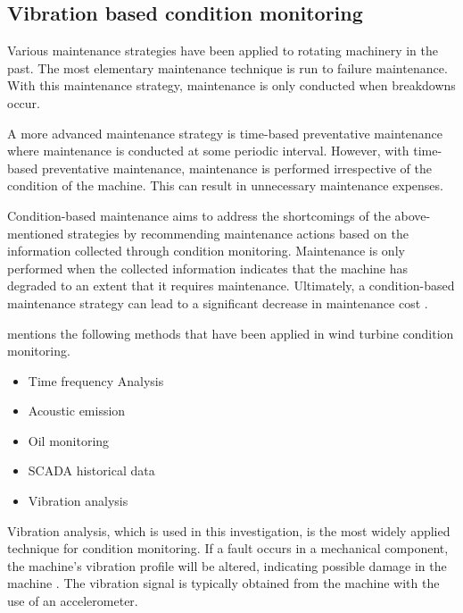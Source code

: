 \subsection{Vibration based condition monitoring}


Various maintenance strategies have been applied to rotating machinery in the past. The most elementary maintenance technique is run to failure maintenance. With this maintenance strategy, maintenance is only conducted when breakdowns occur.

A more advanced maintenance strategy is time-based preventative maintenance where maintenance is conducted at some periodic interval. However, with time-based preventative maintenance, maintenance is performed irrespective of the condition of the machine. This can result in unnecessary maintenance expenses. 

Condition-based maintenance aims to address the shortcomings of the above-mentioned strategies by recommending maintenance actions based on the information collected through condition monitoring. Maintenance is only performed when the collected information indicates that the machine has degraded to an extent that it requires maintenance. Ultimately, a condition-based maintenance strategy can lead to a significant decrease in maintenance cost \citep{Jardine2006}.



\cite{Nie2013} mentions the following methods that have been applied in wind turbine condition monitoring.
\begin{itemize}
	\item Time frequency Analysis
	\item Acoustic emission
	\item Oil monitoring
	\item SCADA historical data 
	\item Vibration analysis
\end{itemize}

Vibration analysis, which is used in this investigation, is the most widely applied technique for condition monitoring. If a fault occurs in a mechanical component, the machine's vibration profile will be altered, indicating possible damage in the machine \citep{Salameh2018}. The vibration signal is typically obtained from the machine with the use of an accelerometer.





